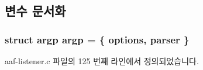 \subsection{변수 문서화}
\subsubsection[{\texorpdfstring{argp}{argp}}]{\setlength{\rightskip}{0pt plus 5cm}struct argp argp = \{ {\bf options}, {\bf parser} \}\hspace{0.3cm}{\ttfamily [static]}}\hypertarget{aaf-listener_8c_ab70c96531b1b652d70c221cfaf3207f3}{}\label{aaf-listener_8c_ab70c96531b1b652d70c221cfaf3207f3}


aaf-\/listener.\+c 파일의 125 번째 라인에서 정의되었습니다.

